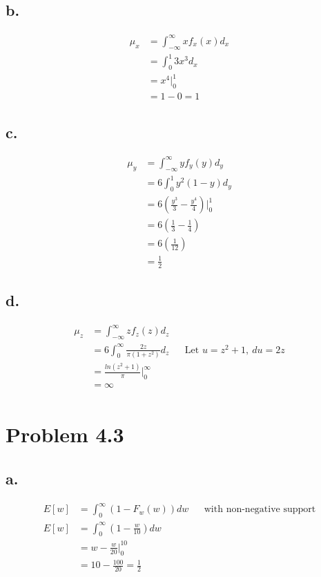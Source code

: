 \documentclass[12pt]{article}
\begin{document}
\subsection*{b.}
\begin{align*}
  \mu_x &= \int_{-\infty}^{\infty} x f_x(x) d_x \\
   &= \int_{0}^{1} 3x^3 d_x \\
   &= x^4 \big|_0^1 \\
   &= 1-0 = 1 
 \end{align*}
\subsection*{c.}
\begin{align*}
  \mu_y &= \int_{-\infty}^{\infty} y f_y(y) d_y \\
   &= 6\int_{0}^{1} y^2(1-y) d_y \\
   &= 6(\frac{y^3}{3} - \frac{y^4}{4}) \big|_0^1 \\
   &= 6(\frac{1}{3} - \frac{1}{4}) \\
   &= 6(\frac{1}{12}) \\
   &= \frac{1}{2} 
 \end{align*}
\subsection*{d.}
\begin{align*}
  \mu_z &= \int_{-\infty}^{\infty} z f_z(z) d_z \\
  &= 6\int_{0}^{\infty} \frac{2z}{\pi(1+z^2)} d_z & & \textrm{Let } u = z^2+1, \ du = 2z \\
  &= \frac{ln(z^2+1)}{\pi} \big|_0^\infty \\
  &= \infty \\
 \end{align*}
\section*{Problem 4.3}
\subsection*{a.}
\begin{align*}
  E[w] &= \int_0^\infty (1-F_w(w))dw & & \textrm{with non-negative support} \\
  E[w] &= \int_0^\infty (1-\frac{w}{10})dw \\
  &= w - \frac{w}{20}\big|_0^{10} \\
  &= 10 - \frac{100}{20} = \frac{1}{2}
\end{align*}
\end{document}
